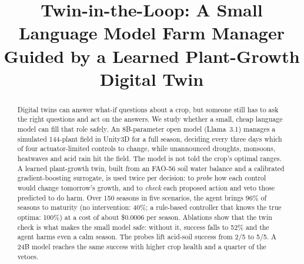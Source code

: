 \documentclass[conference]{IEEEtran}
\begin{document}
\title{Twin-in-the-Loop: A Small Language Model Farm Manager Guided by a Learned Plant-Growth Digital Twin}

\author{
\and
{}
\and
{}
}

\maketitle

\begin{abstract}
Digital twins can answer what-if questions about a crop, but someone still has to ask the
right questions and act on the answers. We study whether a small, cheap language model can fill
that role safely. An 8B-parameter open model (Llama~3.1) manages a simulated 144-plant field in
Unity3D for a full season, deciding every three days which of four actuator-limited controls
to change, while unannounced droughts, monsoons, heatwaves and acid rain hit the field. The
model is not told the crop's optimal ranges. A learned plant-growth twin, built from an FAO-56
soil water balance and a calibrated gradient-boosting surrogate, is used twice per decision: to
\emph{probe} how each control would change tomorrow's growth, and to \emph{check} each proposed
action and veto those predicted to do harm. Over 150 seasons in five scenarios, the agent
brings 96\% of seasons to maturity (no intervention: 40\%; a rule-based controller that knows the
true optima: 100\%) at a cost of about \$0.0006 per season. Ablations show that the twin check is
what makes the small model safe: without it, success falls to 52\% and the agent harms even a
calm season. The probes lift acid-soil success from 2/5 to 5/5. A 24B model reaches the same success
with higher crop health and a quarter of the vetoes.
\end{abstract}
\end{document}

